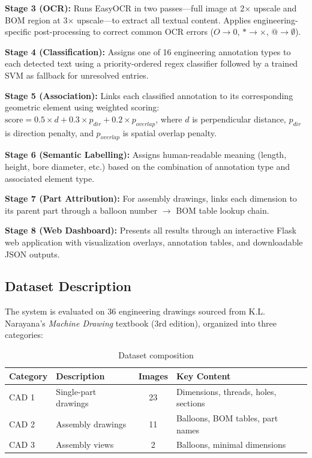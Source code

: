 \documentclass[12pt,a4paper]{article}
\begin{document}
\textbf{Stage 3 (OCR):} Runs EasyOCR in two passes---full image at 2$\times$ upscale and BOM region at 3$\times$ upscale---to extract all textual content. Applies engineering-specific post-processing to correct common OCR errors ($O \rightarrow 0$, $* \rightarrow \times$, $@ \rightarrow \emptyset$).

\textbf{Stage 4 (Classification):} Assigns one of 16 engineering annotation types to each detected text using a priority-ordered regex classifier followed by a trained SVM as fallback for unresolved entries.

\textbf{Stage 5 (Association):} Links each classified annotation to its corresponding geometric element using weighted scoring: $\text{score} = 0.5 \times d + 0.3 \times p_{dir} + 0.2 \times p_{overlap}$, where $d$ is perpendicular distance, $p_{dir}$ is direction penalty, and $p_{overlap}$ is spatial overlap penalty.

\textbf{Stage 6 (Semantic Labelling):} Assigns human-readable meaning (length, height, bore diameter, etc.) based on the combination of annotation type and associated element type.

\textbf{Stage 7 (Part Attribution):} For assembly drawings, links each dimension to its parent part through a balloon number $\rightarrow$ BOM table lookup chain.

\textbf{Stage 8 (Web Dashboard):} Presents all results through an interactive Flask web application with visualization overlays, annotation tables, and downloadable JSON outputs.

\subsection{Dataset Description}

The system is evaluated on 36 engineering drawings sourced from K.L. Narayana's \textit{Machine Drawing} textbook (3rd edition), organized into three categories:

\begin{table}[H]
\centering
\caption{Dataset composition}
\label{tab:dataset}
\begin{tabular}{llcl}
\toprule
\textbf{Category} & \textbf{Description} & \textbf{Images} & \textbf{Key Content} \\
\midrule
CAD 1 & Single-part drawings & 23 & Dimensions, threads, holes, sections \\
CAD 2 & Assembly drawings & 11 & Balloons, BOM tables, part names \\
CAD 3 & Assembly views & 2 & Balloons, minimal dimensions \\
\bottomrule
\end{tabular}
\end{table}
\end{document}
